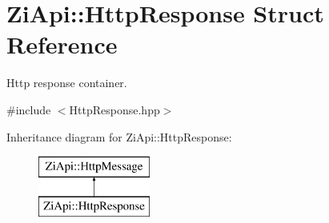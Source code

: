 \hypertarget{structZiApi_1_1HttpResponse}{}\section{Zi\+Api\+::Http\+Response Struct Reference}
\label{structZiApi_1_1HttpResponse}


Http response container.  




{\ttfamily \#include $<$Http\+Response.\+hpp$>$}

Inheritance diagram for Zi\+Api\+::Http\+Response\+:\begin{figure}[H]
\begin{center}
\leavevmode
\includegraphics[height=2.000000cm]{structZiApi_1_1HttpResponse}
\end{center}
\end{figure}
